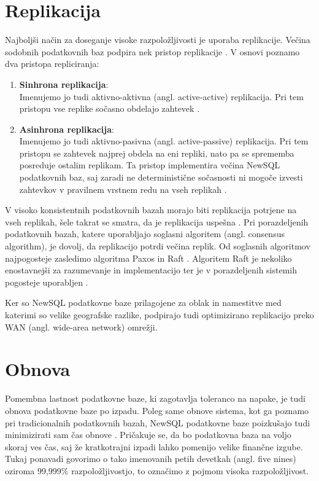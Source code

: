 \documentclass[a4paper, 12pt]{book}
\begin{document}
\section{Replikacija}

Najboljši način za doseganje visoke razpoložljivosti je uporaba replikacije. Večina sodobnih podatkovnih baz podpira nek pristop replikacije \cite{Pavlo2016Sep}. V osnovi poznamo dva pristopa repliciranja:
\begin{enumerate}
    \item \textbf{Sinhrona replikacija}:\\Imenujemo jo tudi aktivno-aktivna (angl. active-active) replikacija. Pri tem pristopu vse replike sočasno obdelajo zahtevek \cite{Pavlo2016Sep}.

    \item \textbf{Asinhrona replikacija}:\\Imenujemo jo tudi aktivno-pasivna (angl. active-passive) replikacija. Pri tem pristopu se zahtevek najprej obdela na eni repliki, nato pa se sprememba posreduje ostalim replikam. Ta pristop implementira večina NewSQL podatkovnih baz, saj zaradi ne deterministične sočas\-nosti ni mogoče izvesti zahtevkov v pravilnem vrstnem redu na vseh replikah \cite{Pavlo2016Sep, harding2017evaluation}.
\end{enumerate}

V visoko konsistentnih podatkovnih bazah morajo biti replikacija potrjene na vseh replikah, šele takrat se smatra, da je replikacija uspešna \cite{NewSqlInMemoryAnalytics}. Pri porazdeljenih podatkovnih bazah, katere uporabljajo soglasni algoritem (angl. consensus algorithm), je dovolj, da replikacijo potrdi večina replik. Od soglasnih algoritmov najpogosteje zasledimo algoritma Paxos in Raft \cite{raft-vs-paxos}. Algoritem Raft je nekoliko enostavnejši za razumevanje in implementacijo ter je v porazdeljenih sistemih pogosteje uporabljen \cite{raft-vs-paxos}. 

Ker so NewSQL podatkovne baze prilagojene za oblak in namestitve med katerimi so velike geografske razlike, podpirajo tudi optimizirano replikacijo preko WAN (angl. wide-area network) omrežji.

\section{Obnova}
Pomembna lastnost podatkovne baze, ki zagotavlja toleranco na napake, je tudi obnova podatkovne baze po izpadu. Poleg same obnove sistema, kot ga poznamo pri tradicionalnih podatkovnih bazah, NewSQL podatkovne baze  poizkušajo tudi minimizirati sam čas obnove \cite{Pavlo2016Sep}. Pričakuje se, da bo podatkovna baza na voljo skoraj ves čas, saj že kratkotrajni izpadi lahko pomenijo velike finančne izgube. Tukaj ponavadi govorimo o tako imenovanih petih devetkah (angl. five nines) oziroma 99,999\% razpoložljivostjo, to označimo z pojmom visoka razpoložljivost.
\end{document}
